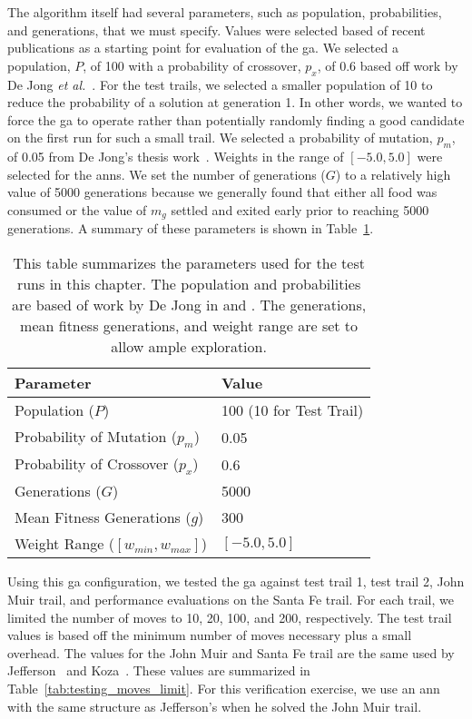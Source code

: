The algorithm itself had several parameters, such as population, probabilities, and generations, that we must specify. Values were selected based of recent publications as a starting point for evaluation of the \gls{ga}. We selected a population, $P$, of 100 with a probability of crossover, $p_x$, of 0.6 based off work by De Jong \textit{et al.}~\cite{De_Jong1991-cq}. For the test trails, we selected a smaller population of 10 to reduce the probability of a solution at generation 1. In other words, we wanted to force the \gls{ga} to operate rather than potentially randomly finding a good candidate on the first run for such a small trail. We selected a probability of mutation, $p_m$, of 0.05 from De Jong's thesis work~\cite{De_Jong1975-wc}. Weights in the range of $[-5.0, 5.0]$ were selected for the \glspl{ann}. We set the number of generations ($G$) to a relatively high value of 5000 generations because we generally found that either all food was consumed or the value of $m_g$ settled and exited early prior to reaching 5000 generations. A summary of these parameters is shown in Table~\ref{tab:testing_run_parameters}.

\begin{table}[ht]
\centering
\begin{tabular}{ll}
\textbf{Parameter}                  & \textbf{Value} \\ \hline
Population ($P$)                    & 100 (10 for Test Trail)   \\
Probability of Mutation ($p_m$)     & 0.05  \\
Probability of Crossover ($p_x$)    & 0.6  \\
Generations ($G$)                   & 5000  \\
Mean Fitness Generations ($g$)      & 300  \\
Weight Range ($[w_{min}, w_{max}]$) & $[-5.0, 5.0]$
\end{tabular}
\caption[Summary of GA Parameters for Test Runs]{This table summarizes the parameters used for the test runs in this chapter. The population and probabilities are based of work by De Jong in \cite{De_Jong1991-cq} and \cite{De_Jong1975-wc}. The generations, mean fitness generations, and weight range are set to allow ample exploration.}
\label{tab:testing_run_parameters}
\end{table}

Using this \gls{ga} configuration, we tested the \gls{ga} against test trail 1, test trail 2, John Muir trail, and performance evaluations on the Santa Fe trail. For each trail, we limited the number of moves to 10, 20, 100, and 200, respectively. The test trail values is based off the minimum number of moves necessary plus a small overhead. The values for the John Muir and Santa Fe trail are the same used by Jefferson~\cite{Jefferson1992-ph} and Koza~\cite{Koza1992-xs}. These values are summarized in Table~\ref{tab:testing_moves_limit}. For this verification exercise, we use an \gls{ann} with the same structure as Jefferson's when he solved the John Muir trail. 

